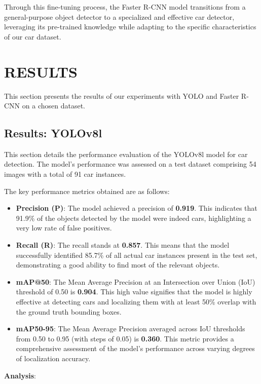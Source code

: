 \documentclass[conference]{IEEEtran}
\begin{document}
Through this fine-tuning process, the Faster R-CNN model transitions from a general-purpose object detector to a specialized and effective car detector, leveraging its pre-trained knowledge while adapting to the specific characteristics of our car dataset.

\section{\uppercase{Results}} 
\label{sec:results}
This section presents the results of our experiments with YOLO and Faster R-CNN on a chosen dataset. 

\subsection{Results: YOLOv8l}
\label{ssec:results_yolo}

This section details the performance evaluation of the YOLOv8l model for car detection. The model's performance was assessed on a test dataset comprising 54 images with a total of 91 car instances.

The key performance metrics obtained are as follows:

\begin{itemize}
    \item \textbf{Precision (P)}: The model achieved a precision of \textbf{0.919}. This indicates that 91.9\% of the objects detected by the model were indeed cars, highlighting a very low rate of false positives.
    \item \textbf{Recall (R)}: The recall stands at \textbf{0.857}. This means that the model successfully identified 85.7\% of all actual car instances present in the test set, demonstrating a good ability to find most of the relevant objects.
    \item \textbf{mAP@50}: The Mean Average Precision at an Intersection over Union (IoU) threshold of 0.50 is \textbf{0.904}. This high value signifies that the model is highly effective at detecting cars and localizing them with at least 50\% overlap with the ground truth bounding boxes.
    \item \textbf{mAP50-95}: The Mean Average Precision averaged across IoU thresholds from 0.50 to 0.95 (with steps of 0.05) is \textbf{0.360}. This metric provides a comprehensive assessment of the model's performance across varying degrees of localization accuracy.
\end{itemize}

\textbf{Analysis}:
\end{document}
